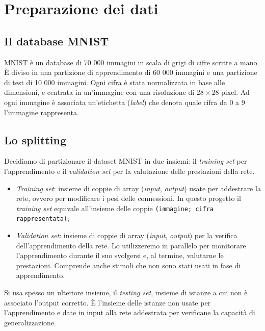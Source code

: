 \documentclass[a4paper,12pt]{article}
\begin{document}
\newpage
\section{Preparazione dei dati} %


\subsection{Il database MNIST}
MNIST è un database di 70 000 immagini in scala di grigi di cifre scritte a mano. È diviso in una partizione di apprendimento di 60 000 immagini e una partizione di test di 10 000 immagini. Ogni cifra è stata normalizzata in base alle dimensioni, e centrata in un'immagine con una risoluzione di $28\times28$ pixel. Ad ogni immagine è associata un'etichetta (\emph{label}) che denota quale cifra da 0 a 9 l'immagine rappresenta. 


\subsection{Lo splitting}
Decidiamo di partizionare il dataset MNIST in due insiemi: il \emph{training set} per l'apprendimento e il \emph{validation set} per la valutazione delle prestazioni della rete.
\begin{itemize}
    \item \emph{Training set}: insieme di coppie di array (\emph{input}, \emph{output}) usate per addestrare la rete, ovvero per modificare i pesi delle connessioni. In questo progetto il \emph{training set} equivale all'insieme delle coppie \texttt{(immagine; cifra rappresentata)};
    \item \emph{Validation set}: insieme di coppie di array (\emph{input}, \emph{output}) per la verifica dell'apprendimento della rete. Lo utilizzeremo in parallelo per monitorare l'apprendimento durante il suo svolgersi e, al termine, valutarne le prestazioni. Comprende anche stimoli che non sono stati usati in fase di apprendimento.
\end{itemize}

Si usa spesso un ulteriore insieme, il \emph{testing set}, insieme di istanze a cui non è associato l'output corretto. È l'insieme delle istanze non usate per l'apprendimento e date in input alla rete addestrata per verificane la capacità di generalizzazione.





\newpage
\end{document}
